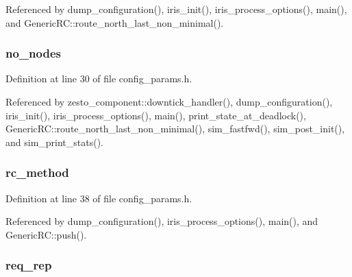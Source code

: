 Referenced by dump\_\-configuration(), iris\_\-init(), iris\_\-process\_\-options(), main(), and GenericRC::route\_\-north\_\-last\_\-non\_\-minimal().
\subsubsection[{no\_\-nodes}]{ {\bf no\_\-nodes}}\label{genericRC_8h_b78c10782810279fb9680eafef33b77d}




Definition at line 30 of file config\_\-params.h.

Referenced by zesto\_\-component::downtick\_\-handler(), dump\_\-configuration(), iris\_\-init(), iris\_\-process\_\-options(), main(), print\_\-state\_\-at\_\-deadlock(), GenericRC::route\_\-north\_\-last\_\-non\_\-minimal(), sim\_\-fastfwd(), sim\_\-post\_\-init(), and sim\_\-print\_\-stats().
\subsubsection[{rc\_\-method}]{ {\bf rc\_\-method}}\label{genericRC_8h_05eafa33205e9c1fe68de799a351f775}




Definition at line 38 of file config\_\-params.h.

Referenced by dump\_\-configuration(), iris\_\-process\_\-options(), main(), and GenericRC::push().
\subsubsection[{req\_\-rep}]{ {\bf req\_\-rep}}\label{genericRC_8h_0245bd43e1f791ade92aad35dd18a590}


